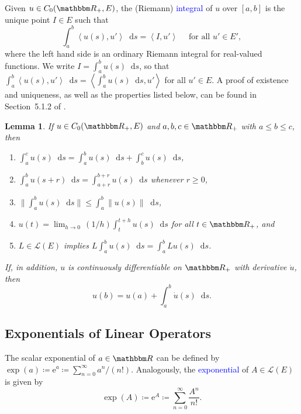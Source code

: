 \documentclass[12pt, reqno]{amsart}
\renewcommand{\leq}{\leqslant}
\renewcommand{\geq}{\geqslant}
\providecommand{\inner}[1]{\left\langle{#1}\right\rangle}
\newcommand{\1}{\mathbbm 1}
\newcommand{\me}{{\mathrm e}}
\newcommand*\diff{\mathop{}\!\mathrm{d}}
\newcommand{\lL}{\mathcal L}
\newcommand{\RR}{\mathbbm R}
\theoremstyle{plain}
\newtheorem{lemma}[theorem]{Lemma}
\theoremstyle{definition}
\newcommand{\navy}[1]{\textcolor{blue}{#1}}
\begin{document}
Given $u \in C_0(\RR_+, E)$, the (Riemann) \navy{integral} of $u$ over $[a,b]$ is the unique point
$I \in E$ such that
%
\begin{equation}\label{eq:rieint}
    \int_a^b \inner{u(s), u'} \diff s = \inner{I, u'} 
    \quad \text{ for all } u' \in E',
\end{equation}
%
where the left hand side is an ordinary Riemann integral for real-valued
functions.  We write $I = \int_a^b u(s) \diff s$, so that $\int_a^b \inner{u(s),
u'} \diff s = \inner{\int_a^b u(s) \diff s, u'}$ for all $u' \in E$.  A proof of
existence and uniqueness, as well as the properties listed below, can be found
in Section~5.1.2 of \cite{buhler2018functional}.

\begin{lemma}\label{l:riemann}
    If $u \in C_0(\RR_+, E)$ and $a, b, c \in \RR_+$ with $a \leq b \leq c$, then
    \begin{enumerate}
        \item $\int_a^c u(s) \diff s 
            = \int_a^b u(s) \diff s + \int_b^c u(s) \diff s$,
        \item $\int_a^b u(s + r) \diff s = \int_{a+r}^{b+r} u(s)
            \diff s$ whenever $r \geq 0$,
        \item $\| \int_a^b u(s) \diff s \| \leq \int_a^b \|
            u(s)  \| \diff s$,
        \item $u(t) = \lim_{h \to 0} \, (1/h) \int_t^{t+h} u(s) \diff s$ for all
            $t \in \RR_+$, and
        \item $L \in \lL(E)$ implies $L \int_a^b u(s) \diff s = \int_a^b Lu(s) \diff s $.
    \end{enumerate}
    If, in addition, $u$ is continuously differentiable on $\RR_+$ with
    derivative $\dot u$, then
    \begin{equation}\label{eq:ftcb}
        u(b) = u(a) + \int_a^b \dot u(s) \diff s.
    \end{equation}
\end{lemma}



\subsection{Exponentials of Linear Operators}

The scalar exponential of $a \in \RR$ can be defined by $\exp(a)
\coloneq \me^a \coloneq \sum_{n=0}^\infty a^n/(n!)$.  Analogously, the \navy{exponential}
of $A \in \lL(E)$ is given by
%
\begin{equation}\label{eq:expfun} 
    \exp(A) 
    \coloneq \me^A \coloneq \sum_{n=0}^\infty \frac{A^n}{n!}.
\end{equation}
%
\end{document}
